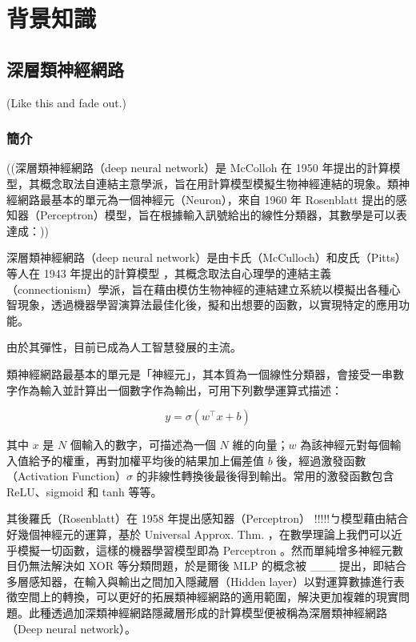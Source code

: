 
\chapter{背景知識}

\section{深層類神經網路}

(Like this \cite{lecun_gradient-based_1998, baevski_wav2vec_2020} and fade out.)

\subsection{簡介}

((深層類神經網路（deep neural network）是 McColloh 在 1950 年提出的計算模型，其概念取法自連結主意學派，旨在用計算模型模擬生物神經連結的現象。類神經網路最基本的單元為一個神經元（Neuron），來自 1960 年 Rosenblatt 提出的感知器（Perceptron）模型，旨在根據輸入訊號給出的線性分類器，其數學是可以表達成：))


深層類神經網路（deep neural network）是由卡氏（McCulloch）和皮氏（Pitts）等人在 1943 年提出的計算模型 \cite{mcculloch_logical_1943}，其概念取法自心理學的連結主義（connectionism）學派，旨在藉由模仿生物神經的連結建立系統以模擬出各種心智現象，透過機器學習演算法最佳化後，擬和出想要的函數，以實現特定的應用功能。


由於其彈性，目前已成為人工智慧發展的主流。

類神經網路最基本的單元是「神經元」，其本質為一個線性分類器，會接受一串數字作為輸入並計算出一個數字作為輸出，可用下列數學運算式描述：

\[ y=\sigma(w^\top x + b) \]

其中 \(x\) 是 \(N\) 個輸入的數字，可描述為一個 \(N\) 維的向量；\(w\) 為該神經元對每個輸入值給予的權重，再對加權平均後的結果加上偏差值 \(b\) 後，經過激發函數（Activation Function）\(\sigma\) 的非線性轉換後最後得到輸出。常用的激發函數包含 ReLU、sigmoid 和 tanh 等等。

其後羅氏（Rosenblatt）在 1958 年提出感知器（Perceptron） !!!!!ㄅ模型藉由結合好幾個神經元的運算，基於 Universal Approx. Thm. ，在數學理論上我們可以近乎模擬一切函數，這樣的機器學習模型即為 Perceptron \cite{rosenblatt_perceptron_1958}。然而單純增多神經元數目仍無法解決如 XOR 等分類問題，於是爾後 MLP 的概念被 \_\_\_ 提出，即結合多層感知器，在輸入與輸出之間加入隱藏層（Hidden layer）以對運算數據進行表徵空間上的轉換，可以更好的拓展類神經網路的適用範圍，解決更加複雜的現實問題。此種透過加深類神經網路隱藏層形成的計算模型便被稱為深層類神經網路（Deep neural network）。

